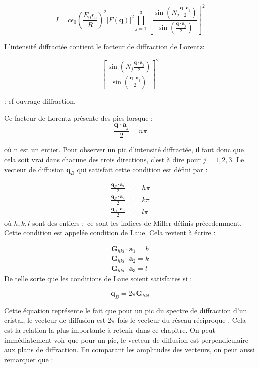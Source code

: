 \begin{equation}
    I = c\epsilon_0 \left( \frac{E_0 r_e}{R} \right)^2 |F(\mathbf{q})|^2
    \prod_{j=1}^3 \left[ \frac{\sin \left(N_j \frac{\mathbf{q\cdot a}_j}{2} \right)}{\sin \left( \frac{\mathbf{q\cdot a}_j}{2}\right)} \right]^2
\end{equation}

L'intensité diffractée contient le facteur de diffraction de Lorentz:

\begin{equation}
    \left[ \frac{\sin \left(N_j \frac{\mathbf{q\cdot a}_j}{2} \right)}{\sin \left( \frac{\mathbf{q\cdot a}_j}{2}\right)} \right]^2
\end{equation}

\TODO: cf ouvrage diffraction.

Ce facteur de Lorentz présente des pics lorsque :
\begin{equation}
    \frac{\mathbf{q \cdot a}_j}{2} = n \pi
\end{equation}

où n est un entier. Pour observer un pic d'intensité diffractée, il faut donc
que cela soit vrai dans chacune des trois directions, c'est à dire pour
$j = 1,2,3$. Le vecteur de diffusion $\mathbf{q}_B$ qui satisfait cette condition
est défini par :

\begin{eqnarray}
    \frac{\mathbf{q}_B \cdot \mathbf{a}_1}{2} & = & h \pi \\
    \frac{\mathbf{q}_B \cdot \mathbf{a}_2}{2} & = & k \pi \\
    \frac{\mathbf{q}_B \cdot \mathbf{a}_3}{2} & = & l \pi
\end{eqnarray}
où $h,k,l$ sont des entiers ; ce sont les indices de Miller définis précedemment.
Cette condition est appelée condition de Laue. Cela revient à écrire :

\begin{eqnarray}
    \mathbf{G}_{hkl} \cdot \mathbf{a}_1 = h \\
    \mathbf{G}_{hkl} \cdot \mathbf{a}_2 = k \\
    \mathbf{G}_{hkl} \cdot \mathbf{a}_3 = l
\end{eqnarray}
De telle sorte que les conditions de Laue soient satisfaites si :

\begin{equation}
    \mathbf{q}_B = 2\pi \mathbf{G}_{hkl}
\end{equation}

Cette équation représente le fait que pour un pic du spectre de diffraction d'un
cristal, le vecteur de diffusion est $2 \pi$ fois le vecteur du réseau réciproque
. Cela est la relation la plus importante à retenir dans ce chapitre. On peut
immédiatement voir que pour un pic, le vecteur de diffusion est perpendiculaire
aux plans de diffraction. En comparant les amplitudes des vecteurs, on peut aussi
remarquer que :

